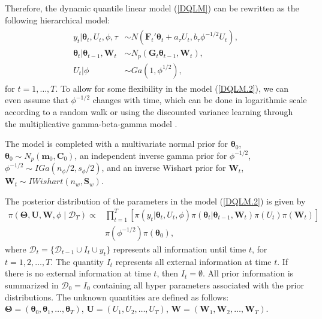\documentclass[12pt,a4paper]{article}\usepackage[]{graphicx}\usepackage[]{color}\usepackage{subfigure}
\newcommand{\bfFt}{\mathbf{F}_t}
\newcommand{\bfGt}{\mathbf{G}_t}
\newcommand{\bfWt}{\mathbf{W}_t}
\newcommand{\bftheta}{\boldsymbol{\theta}}
\newcommand{\bfTheta}{\boldsymbol{\Theta}}
\newcommand{\mathD}{\mathcal{D}}
\begin{document}
Therefore, the dynamic quantile linear model (\ref{DQLM}) can be rewritten as the following hierarchical model: 
\begin{align}  
\begin{array}{rl}\label{DQLM.2}
y_t | \bftheta_t, U_t, \phi, \tau & \sim  N\left( \bfFt' \bftheta_t + a_\tau U_t, b_\tau \phi^{-1/2} U_t\right), \\
\bftheta_t | \bftheta_{t-1}, \mathbf{W}_t & \sim  N_{p}\left( \bfGt \bftheta_{t-1} , \bfWt \right), \\ 
U_t | \phi & \sim Ga(1,\phi^{1/2}),
\end{array}
\end{align}
for $t=1,\dots,T$.
To allow for some flexibility in the model (\ref{DQLM.2}), we can even assume that $\phi^{-1/2}$ changes with time, which can be done in logarithmic scale according to a random walk or using the discounted variance learning through the multiplicative gamma-beta-gamma model \cite[chapter 10, p. 357]{west1997}.

The model is completed with a multivariate normal prior for $\bftheta_0$, $\bftheta_0\sim N_p\left(\mathbf{m}_0,\mathbf{C}_0\right)$, 
an independent inverse gamma prior for $\phi^{-1/2}$, $\phi^{-1/2} \sim IGa(n_{\phi}/2, s_{\phi}/2)$, and an inverse Wishart 
prior for $\bfWt$, $\bfWt \sim IWishart( n_w, \mathbf{S}_w)$.

The posterior distribution of the parameters in the model (\ref{DQLM.2}) is given by
\begin{align}\label{posteriorDQLM.2}
\pi(\bfTheta, \mathbf{U}, \mathbf{W}, \phi \mid \mathD_{T}) \propto &\prod_{t=1}^{T}\left[ \pi(y_t | \bftheta_t, U_t, \phi) \pi(\bftheta_t|\bftheta_{t-1},\mathbf{W}_t)\pi(U_t) \pi(\bfWt)\right]\\
&\pi(\phi^{-1/2}) \pi(\bftheta_0),\nonumber
\end{align}
where $\mathD_{t} = \{\mathD_{t-1} \cup I_t \cup  y_t\}$ represents all information until time $t$, for $t=1,2,\ldots,T$. 
The quantity $I_t$ represents all external information at time $t$. If there is no external information at time $t$, then $I_t = \emptyset$. 
All prior information is summarized in $\mathD_0 = I_0$ containing all hyper parameters associated with the prior distributions. The unknown quantities are defined as follows: $\bfTheta = (\bftheta_0,\bftheta_1,\ldots,\bftheta_T)$,  $\mathbf{U} = (U_1,U_2,\ldots,U_T)$, $\mathbf{W} = (\mathbf{W}_1, \mathbf{W}_2,\ldots,\mathbf{W}_T)$.
\end{document}
